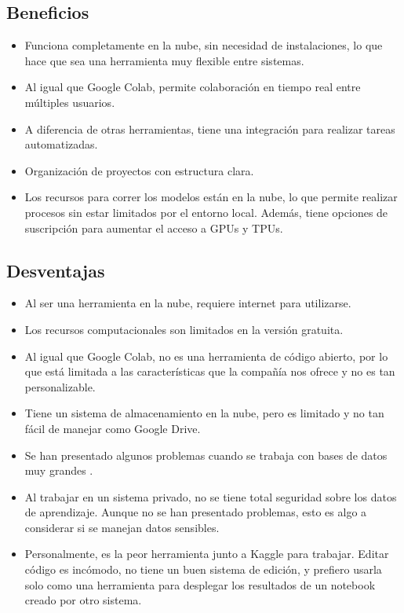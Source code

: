 \documentclass[a4paper,12pt]{article}
\begin{document}
\subsection{Beneficios}
\begin{itemize}
    \item Funciona completamente en la nube, sin necesidad de instalaciones, lo que hace que sea una herramienta muy flexible entre sistemas.
    \item Al igual que Google Colab, permite colaboración en tiempo real entre múltiples usuarios.
    \item A diferencia de otras herramientas, tiene una integración para realizar tareas automatizadas.
    \item Organización de proyectos con estructura clara.
    \item Los recursos para correr los modelos están en la nube, lo que permite realizar procesos sin estar limitados por el entorno local. Además, tiene opciones de suscripción para aumentar el acceso a GPUs y TPUs.
\end{itemize}

\subsection{Desventajas}
\begin{itemize}
    \item Al ser una herramienta en la nube, requiere internet para utilizarse.
    \item Los recursos computacionales son limitados en la versión gratuita.
    \item Al igual que Google Colab, no es una herramienta de código abierto, por lo que está limitada a las características que la compañía nos ofrece y no es tan personalizable.
    \item Tiene un sistema de almacenamiento en la nube, pero es limitado y no tan fácil de manejar como Google Drive.
    \item Se han presentado algunos problemas cuando se trabaja con bases de datos muy grandes \cite{medium_comparison_2024}.
    \item Al trabajar en un sistema privado, no se tiene total seguridad sobre los datos de aprendizaje. Aunque no se han presentado problemas, esto es algo a considerar si se manejan datos sensibles.
    \item Personalmente, es la peor herramienta junto a Kaggle para trabajar. Editar código es incómodo, no tiene un buen sistema de edición, y prefiero usarla solo como una herramienta para desplegar los resultados de un notebook creado por otro sistema.
\end{itemize}
\end{document}
